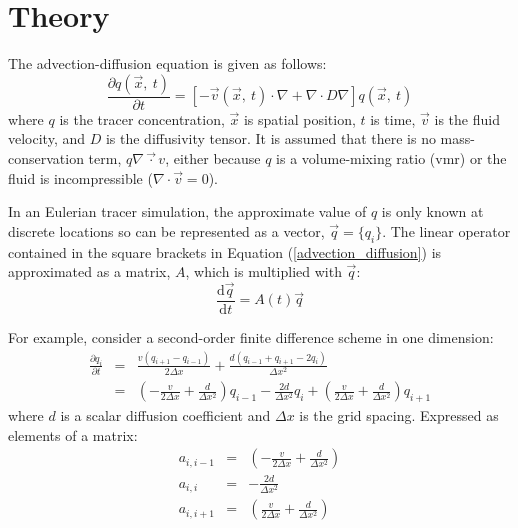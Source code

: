\documentclass{article}
\begin{document}
\newcommand{\vect}[1]{\ensuremath{\vec #1}}

\section{Theory}

The advection-diffusion equation is given as follows:
\begin{equation}
\frac{\partial q(\vect x, ~ t)}{\partial t} = \left [ -\vect v(\vect x, ~t) \cdot \nabla + \nabla \cdot D \nabla \right ] q(\vect x, ~ t)
\label{advection_diffusion}
\end{equation}
where $q$ is the tracer concentration, $\vect x$ is spatial position, 
$t$ is time, $\vect v$ is the fluid velocity, and $D$ is the diffusivity tensor.
It is assumed that there is no mass-conservation term, $q \nabla \vect \cdot v$,
either because $q$ is a volume-mixing ratio (vmr) or 
the fluid is incompressible ($\nabla \cdot \vec v = 0$).

In an Eulerian tracer simulation, the approximate value of $q$
is only known at discrete locations so can be represented as a vector,
$\vect q=\lbrace q_i \rbrace$.
The linear operator contained in the square brackets in Equation 
(\ref{advection_diffusion}) is approximated as a matrix, $A$, which is 
multiplied with $\vect q$:
\begin{equation}
\frac{\mathrm d \vect q}{\mathrm d t} = A(t) \vect q
\label{linear_ODE}
\end{equation}

For example, consider a second-order finite difference scheme in one dimension:
\begin{eqnarray}
\frac{\partial q_i}{\partial t} & = & \frac{v(q_{i+1} - q_{i-1})}{2 \Delta x} +
	\frac{d (q_{i-1} + q_{i+1} - 2 q_i)}{\Delta x^2} \\
& = & \left (- \frac{v}{2 \Delta x} + \frac{d}{\Delta x^2} \right ) q_{i-1} -
	\frac{2 d}{\Delta x^2} q_i + 
	\left (\frac{v}{2 \Delta x} + \frac{d}{\Delta x^2} \right ) q_{i+1} \label{finite_difference_diffusion}
\end{eqnarray}
where $d$ is a scalar diffusion coefficient and $\Delta x$ is the grid spacing.
Expressed as elements of a matrix:
\begin{eqnarray}
a_{i,i-1} & = & \left (- \frac{v}{2 \Delta x} + \frac{d}{\Delta x^2} \right ) \\
	a_{i,i} & = & -\frac{2 d}{\Delta x^2} \\
a_{i,i+1} & = & \left (\frac{v}{2 \Delta x} + \frac{d}{\Delta x^2} \right )
\end{eqnarray}
\end{document}
